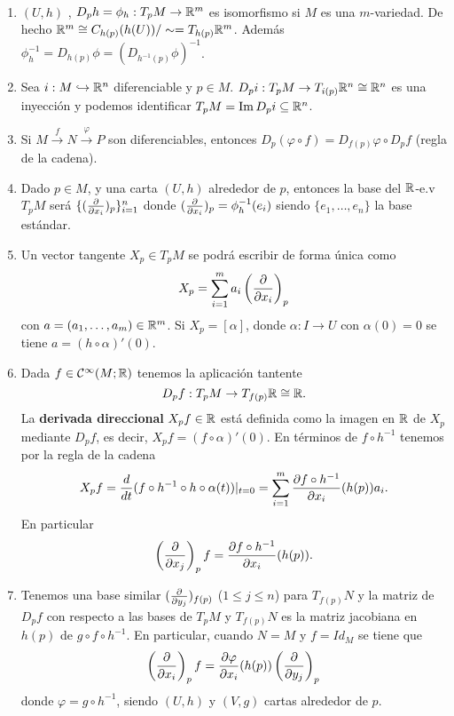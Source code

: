 \documentclass[CV.tex]{subfiles}
\begin{document}
\begin{nota}\
\begin{enumerate}
\item $(U,h)$ , $D_ph=\phi_h:T_pM\to\mathbb{R}^m$ es isomorfismo si $M$ es una $m$-variedad. De hecho $\mathbb{R}^m\cong C_{h(p)}(h(U))/\sim =T_{h(p)}\mathbb{R}^m$. Además $\phi^{-1}_h=D_{h(p)}\phi=(D_{h^{-1}(p)}\phi)^{-1}$.
\item Sea $i:M\hookrightarrow \mathbb{R}^n$ diferenciable y $p\in M$. $D_pi:T_pM\to T_{i(p)}\mathbb{R}^n\cong\mathbb{R}^n$ es una inyección y podemos identificar $T_pM=\operatorname{Im} D_pi\subseteq\mathbb{R}^n$. 
\item Si $M\overset{f}{\to}N\overset{\varphi}{\to}P$ son diferenciables, entonces $D_p(\varphi\circ f)=D_{f(p)}\varphi\circ D_pf$ (regla de la cadena).
\item Dado $p\in M$, y una carta $(U,h)$ alrededor de $p$, entonces la base del $\mathbb{R}$-e.v $T_pM$ será $\{(\frac{\partial }{\partial x_i})_p\}_{i=1
}^n$ donde $(\frac{\partial }{\partial x_i})_p=\phi^{-1}_h(e_i)$ siendo $\{e_1,\dots, e_n\}$ la base estándar.
\item Un vector tangente $X_p\in T_pM$ se podrá escribir de forma única como
\begin{equation}\label{coord}
X_p=\sum_{i=1}^m a_i\left(\frac{\partial }{\partial x_i}\right)_p
\end{equation}
con $a=(a_1,\dots, a_m)\in\mathbb{R}^m$. Si $X_p=[\alpha]$, donde $\alpha:I\to U$ con $\alpha(0)=0$ se tiene $a=(h\circ \alpha)'(0)$. 

\item Dada $f\in\mathcal{C}^{\infty}(M;\mathbb{R})$ tenemos la aplicación tantente
\[
D_pf:T_pM\to T_{f(p)}\mathbb{R}\cong\mathbb{R}.
\]
La \textbf{derivada direccional} $X_pf\in\mathbb{R}$ está definida como la imagen en $\mathbb{R}$ de $X_p$ mediante $D_pf$, es decir, $X_pf=(f\circ\alpha)'(0)$. En términos de $f\circ h^{-1}$ tenemos por la regla de la cadena
\[
X_pf=\frac{d}{dt}(f\circ h^{-1}\circ h\circ \alpha(t))|_{t=0}=\sum_{i=1}^m\frac{\partial f\circ h^{-1}}{\partial x_i}(h(p))a_i.
\]
En particular 
\[
\left(\frac{\partial }{\partial x_j}\right)_pf=\frac{\partial f\circ h^{-1}}{\partial x_i}(h(p)).
\]
\item Tenemos una base similar $(\frac{\partial }{\partial y_j})_{f(p)}$ ($1\leq j\leq n$) para $T_{f(p)}N$ y la matriz de $D_pf$ con respecto a las bases de $T_pM$ y $T_{f(p)}N$ es la matriz jacobiana en $h(p)$ de $g\circ f\circ h^{-1}$. En particular, cuando $N=M$ y $f=Id_M$ se tiene que
\begin{equation}\label{cambio}
\left(\frac{\partial }{\partial x_i}\right)_pf=\frac{\partial \varphi}{\partial x_i}(h(p))\left(\frac{\partial }{\partial y_j}\right)_p
\end{equation}
donde $\varphi=g\circ h^{-1}$, siendo $(U,h)$ y $(V,g)$ cartas alrededor de $p$. 
\end{enumerate}
\end{nota}
\end{document}
